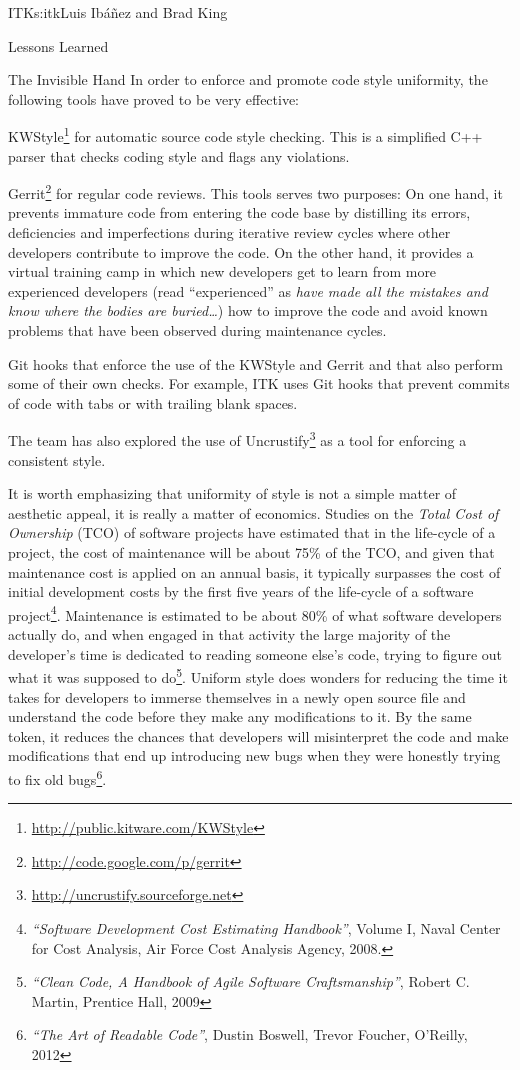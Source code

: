 \begin{aosachapter}{ITK}{s:itk}{Luis Ib\'{a}\~{n}ez and Brad King}
\begin{aosasect1}{Lessons Learned}
\begin{aosasect2}{The Invisible Hand}
In order to enforce and promote code style uniformity, the following tools have
proved to be very effective:

\begin{aosaitemize}
\item KWStyle\footnote{\url{http://public.kitware.com/KWStyle}} for automatic
source code style checking. This is a simplified C++ parser that checks coding style and
flags any violations.
\item Gerrit\footnote{\url{http://code.google.com/p/gerrit}} for regular code
reviews. This tools serves two purposes: On one hand, it prevents immature
code from entering the code base by distilling its errors, deficiencies and
imperfections during iterative review cycles where other developers contribute
to improve the code. On the other hand, it provides a virtual
training camp in which new developers get to learn from more experienced
developers (read ``experienced'' as \emph{have made all the
mistakes and know where the bodies are buried\ldots}) how to improve the
code and avoid known problems that have been observed during maintenance
cycles.
\item Git hooks that enforce the use of the KWStyle and Gerrit and that also
perform some of their own checks. For example, ITK uses Git hooks that prevent
commits of code with tabs or with trailing blank spaces.
\item The team has also explored the use of
Uncrustify\footnote{\url{http://uncrustify.sourceforge.net}} as a tool for
enforcing a consistent style.
\end{aosaitemize}

It is worth emphasizing that uniformity of style is not a simple matter of
aesthetic appeal, it is really a matter of economics.
Studies on the \emph{Total Cost of Ownership} (TCO) of software projects have
estimated that in the life-cycle of a project, the cost of maintenance will be
about 75\% of the TCO, and given that maintenance cost is applied on an annual
basis, it typically surpasses the cost of initial development costs by the
first five years of the life-cycle of a software
project\footnote{\emph{``Software Development Cost Estimating Handbook''},
Volume I, Naval Center for Cost Analysis, Air Force Cost Analysis Agency,
2008.}. Maintenance is estimated to be about 80\% of what software developers
actually do, and when engaged in that activity the large majority of the
developer's time is dedicated to reading someone else's code, trying to figure
out what it was supposed to do\footnote{\emph{``Clean Code, A Handbook of
Agile Software Craftsmanship''}, Robert C.  Martin, Prentice Hall, 2009}.
Uniform style does wonders for reducing the time it takes for developers to
immerse themselves in a newly open source file and understand the code before
they make any modifications to it.  By the same token, it reduces the chances
that developers will misinterpret the code and make modifications
that end up introducing new bugs when they were honestly trying to fix old
bugs\footnote{\emph{``The Art of Readable Code''}, Dustin Boswell, Trevor
Foucher, O'Reilly, 2012}.


\end{aosasect2}
\end{aosasect1}
\end{aosachapter}
